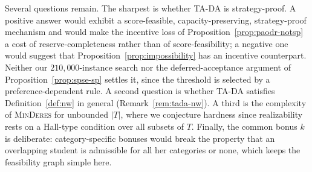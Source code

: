\documentclass[a4paper,twoside]{article}
\theoremstyle{definition}
\begin{document}
Several questions remain. The sharpest is whether TA-DA is strategy-proof. A positive answer would exhibit a score-feasible, capacity-preserving, strategy-proof mechanism and would make the incentive loss of Proposition~\ref{prop:paodr-notsp} a cost of reserve-completeness rather than of score-feasibility; a negative one would suggest that Proposition~\ref{prop:impossibility} has an incentive counterpart. Neither our $210{,}000$-instance search nor the deferred-acceptance argument of Proposition~\ref{prop:spse-sp} settles it, since the threshold is selected by a preference-dependent rule. A second question is whether TA-DA satisfies Definition~\ref{def:nw} in general (Remark~\ref{rem:tada-nw}). A third is the complexity of \textsc{MinDeres} for unbounded $|T|$, where we conjecture hardness since realizability rests on a Hall-type condition over all subsets of $T$. Finally, the common bonus $k$ is deliberate: category-specific bonuses would break the property that an overlapping student is admissible for all her categories or none, which keeps the feasibility graph simple here.







\end{document}
